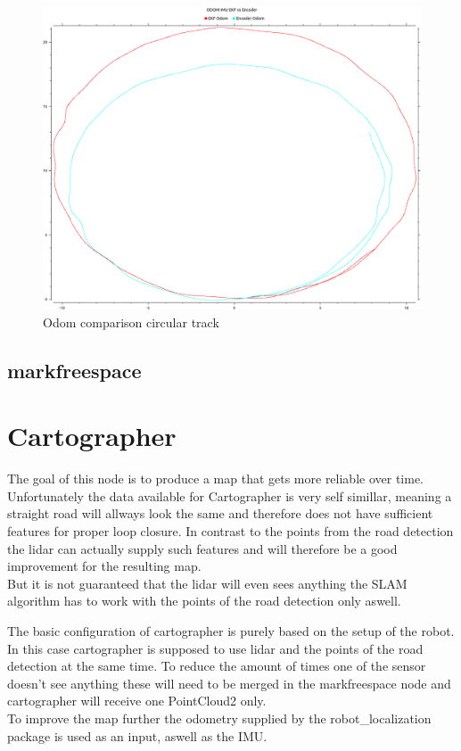 \begin{figure}
	\includegraphics[width=\textwidth]{Pictures/circle odom}
	\caption{Odom comparison circular track}
	\label{circular track}

\end{figure}
 
\subsection{markfreespace}


\section{Cartographer}
The goal of this node is to produce a map that gets more reliable over time.\\

Unfortunately the data available for Cartographer is very self simillar, meaning a straight road will allways look the same and therefore does not have sufficient features for proper loop closure. In contrast to the points from the road detection the lidar can actually supply such features and will therefore be a good improvement for the resulting map.\\

But it is not guaranteed that the lidar will even sees anything the SLAM algorithm has to work with the points of the road detection only aswell.

The basic configuration of cartographer is purely based on the setup of the robot. In this case cartographer is supposed to use lidar and the points of the road detection at the same time. To reduce the amount of times one of the sensor doesn't see anything these will need to be merged in the markfreespace node and cartographer will receive one PointCloud2 only.\\
To improve the map further the odometry supplied by the robot\_localization package is used as an input, aswell as the IMU.

